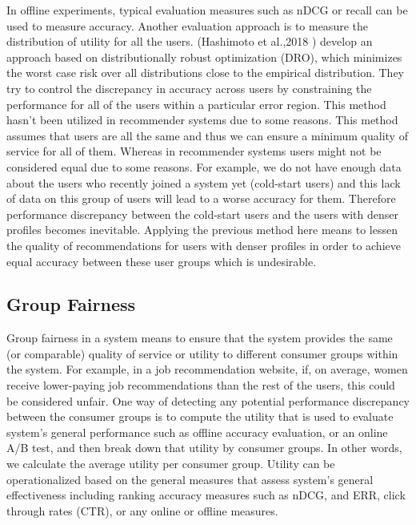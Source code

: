     In offline experiments, typical evaluation measures such as nDCG or recall can be used to measure accuracy. Another evaluation approach is to measure the distribution of utility for all the users. (Hashimoto et al.,2018 \cite{hashimoto2018fairness}) develop an approach based on distributionally robust optimization (DRO), which minimizes the worst case risk over all distributions close to the empirical distribution. They try to control the discrepancy in accuracy across users by constraining the performance for all of the users within a particular error region. This method hasn't been utilized in recommender systems due to some reasons. This method assumes that users are all the same and thus we can ensure a minimum quality of service for all of them. Whereas in recommender systems users might not be considered equal due to some reasons. For example, we do not have enough data about the users who recently joined a system yet (cold-start users) and this lack of data on this group of users will lead to a worse accuracy for them. Therefore performance discrepancy between the cold-start users and the users with denser profiles becomes inevitable. Applying the previous method here means to lessen the quality of recommendations for users with denser profiles in order to achieve equal accuracy between these user groups which is undesirable.
    
    \subsection{Group Fairness}
    Group fairness in a system means to ensure that the system provides the same (or comparable) quality of service or utility to different consumer groups within the system. For example, in a job recommendation website, if, on average, women receive lower-paying job recommendations than the rest of the users, this could be considered unfair. One way of detecting any potential performance discrepancy between the consumer groups is to compute the utility that is used to evaluate system's general performance such as offline accuracy evaluation, or an online A/B test, and then break down that utility by consumer groups. In other words, we calculate the average utility per consumer group. Utility can be operationalized based on the general measures that assess system's general effectiveness including ranking accuracy measures such as nDCG, and ERR, click through rates (CTR), or any online or offline measures.
    
